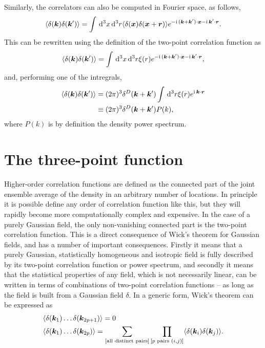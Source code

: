 Similarly, the correlators can also be computed in Fourier space, as follows, 
\begin{equation}
	\langle \delta(\bm {k}) \delta(\bm {k}') \rangle = \int \,\mathrm{d}^3 x \,\mathrm{d}^3 r \langle \delta(\bm {x}) \delta(\bm {x} + \bm{r})\rangle e^{-\mathrm{i\,} (\bm {k} + \bm {k}') \cdot \bm {x} - \mathrm{i\,} \bm {k}' \cdot \bm{r}}.
\end{equation}
This can be rewritten using the definition of the two-point correlation function as 
\begin{equation}
	\langle \delta(\bm {k}) \delta(\bm {k}') \rangle = \int \,\mathrm{d}^3 x \,\mathrm{d}^3 r \xi(r) e^{-\mathrm{i\,} (\bm {k} + \bm {k}') \cdot \bm {x} - \mathrm{i\,} \bm {k}' \cdot \bm{r}},
\end{equation}
and, performing one of the intregrals, 
\begin{align}
	\langle \delta(\bm {k}) \delta(\bm {k}') \rangle &= (2\pi)^3 \delta^D(\bm {k} + \bm {k}') \int \,\mathrm{d}^3 r \xi(r) e^{\mathrm{i\,} \bm {k} \cdot \bm{r}} \\
	&\equiv (2\pi)^3 \delta^D(\bm {k} + \bm {k}') P(k),
\end{align}
where $P(k)$ is by definition the density power spectrum.

\section{The three-point function}

Higher-order correlation functions are defined as the connected part of the joint ensemble average of the density in an arbitrary number of locations. In principle it is possible define any order of correlation function like this, but they will rapidly become more computationally complex and expensive. In the case of a purely Gaussian field, the only non-vanishing connected part is the two-point correlation function. This is a direct consequence of Wick's theorem for Gaussian fields, and has a number of important consequences. Firstly it means that a purely Gaussian, statistically homogeneous and isotropic field is fully described by its two-point correlation function or power spectrum, and secondly it means that the statistical properties of any field, which is not necessarily linear, can be written in terms of combinations of two-point correlation functions -- as long as the field is built from a Gaussian field $\delta$. In a generic form, Wick's theorem can be expressed as 
\begin{align}
	&\langle \delta(\bm {k}_1) \ldots \delta(\bm{k}_{2p + 1}) \rangle = 0 \nonumber \\
	&\langle \delta(\bm {k}_1) \ldots \delta(\bm{k}_{2p})\rangle = \sum_{[\text{all distinct pairs}]} \prod_{[p \text{ pairs } (i,j)]} \langle \delta(\bm{k}_i) \delta(\bm{k}_j) \rangle.  
\end{align}

